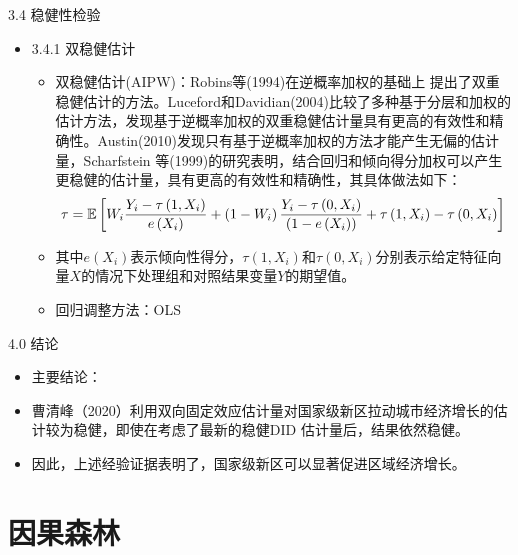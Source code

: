 \documentclass{beamer}%
\begin{document}
\begin{frame}[t]{\large 3.4 稳健性检验}
\begin{itemize}
  \item 3.4.1 双稳健估计
  \begin{itemize}
  \item 双稳健估计(AIPW)：Robins等(1994)在逆概率加权的基础上 提出了双重稳健估计的方法。Luceford和Davidian(2004)比较了多种基于分层和加权的估计方法，发现基于逆概率加权的双重稳健估计量具有更高的有效性和精确性。Austin(2010)发现只有基于逆概率加权的方法才能产生无偏的估计量，Scharfstein 等(1999)的研究表明，结合回归和倾向得分加权可以产生更稳健的估计量，具有更高的有效性和精确性，其具体做法如下：
    \begin{equation}
    \setlength{\abovedisplayskip}{4pt}
    \setlength{\belowdisplayskip}{4pt}
    \tau=\mathbb{E}\left[W_i \frac{Y_i-\tau\left(1, X_i\right)}{e\left(X_i\right)}+\left(1-W_i\right) \frac{Y_i-\tau\left(0, X_i\right)}{\left(1-e\left(X_i\right)\right)}+\tau\left(1, X_i\right)-\tau\left(0, X_i\right)\right]
    \end{equation}
  \item 其中$e\left(X_i\right)$表示倾向性得分，$\tau\left(1, X_i\right)$和$\tau\left(0, X_i\right)$分别表示给定特征向量$X$的情况下处理组和对照结果变量$Y$的期望值。
  \item 回归调整方法：OLS
  \end{itemize}
\end{itemize}
\end{frame}



\begin{frame}[t]{\large 4.0 结论}
\begin{itemize}
  \item 主要结论：
\end{itemize}
\begin{itemize}
  \item 曹清峰（2020）利用双向固定效应估计量对国家级新区拉动城市经济增长的估计较为稳健，即使在考虑了最新的稳健DID 估计量后，结果依然稳健。
  \item 因此，上述经验证据表明了，国家级新区可以显著促进区域经济增长。
\end{itemize}
\end{frame}




\section{因果森林}  %
\end{document}
